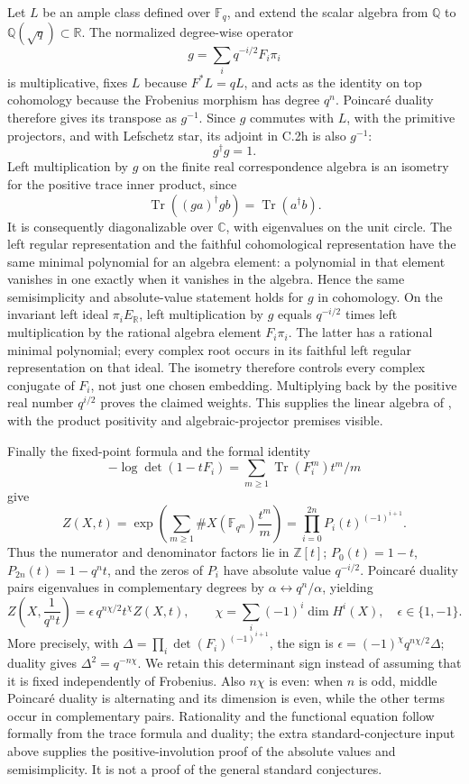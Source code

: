 Let $L$ be an ample class defined over $\mathbb F_q$, and extend the
scalar algebra from $\mathbb Q$ to $\mathbb Q(\sqrt q)\subset\mathbb R$.
The normalized degree-wise operator
\[
                   g=\sum_i q^{-i/2}F_i\pi_i
\]
is multiplicative, fixes $L$ because $F^*L=qL$, and acts as the
identity on top cohomology because the Frobenius morphism has degree
$q^n$. Poincar\'e duality therefore gives its transpose as $g^{-1}$.
Since $g$ commutes with $L$, with the primitive projectors, and with
Lefschetz star, its adjoint in C.2h is also $g^{-1}$:
\[
                             g^\dagger g=1.
\]
Left multiplication by $g$ on the finite real correspondence algebra
is an isometry for the positive trace inner product, since
\[
 \operatorname{Tr}((ga)^\dagger gb)
                   =\operatorname{Tr}(a^\dagger b).
\]
It is consequently diagonalizable over $\mathbb C$, with eigenvalues
on the unit circle. The left regular representation and the faithful
cohomological representation have the same minimal polynomial for an
algebra element: a polynomial in that element vanishes in one exactly
when it vanishes in the algebra. Hence the same semisimplicity and
absolute-value statement holds for $g$ in cohomology. On the invariant
left ideal $\pi_iE_{\mathbb R}$, left multiplication by $g$ equals
$q^{-i/2}$ times left multiplication by the rational algebra element
$F_i\pi_i$. The latter has a rational minimal polynomial; every complex
root occurs in its faithful left regular representation on that ideal.
The isometry therefore controls every complex conjugate of $F_i$, not
just one chosen embedding. Multiplying back by the positive real
number $q^{i/2}$ proves the claimed weights.
This supplies the linear algebra of
\citet[Lemma 4.6 and Theorem 4.7]{cyKleiman1968}, with the product
positivity and algebraic-projector premises visible.

Finally the fixed-point formula and the formal identity
\[
-\log\det(1-tF_i)=\sum_{m\ge1}\operatorname{Tr}(F_i^m)t^m/m
\]
give
\[
 Z(X,t)=\exp\left(\sum_{m\ge1}\#X(\mathbb F_{q^m})\frac{t^m}{m}\right)
       =\prod_{i=0}^{2n}P_i(t)^{(-1)^{i+1}}.
\]
Thus the numerator and denominator factors lie in $\mathbb Z[t]$;
$P_0(t)=1-t$, $P_{2n}(t)=1-q^nt$, and the zeros of $P_i$ have
absolute value $q^{-i/2}$. Poincar\'e duality pairs eigenvalues in
complementary degrees by $\alpha\leftrightarrow q^n/\alpha$, yielding
\[
 Z\left(X,\frac1{q^nt}\right)
        =\epsilon\,q^{n\chi/2}t^\chi Z(X,t),
 \qquad \chi=\sum_i(-1)^i\dim H^i(X),\quad \epsilon\in\{1,-1\}.
\]
More precisely, with
$\Delta=\prod_i\det(F_i)^{(-1)^{i+1}}$, the sign is
$\epsilon=(-1)^\chi q^{n\chi/2}\Delta$;
duality gives $\Delta^2=q^{-n\chi}$.
We retain this determinant sign instead of assuming that it is
fixed independently of Frobenius. Also $n\chi$ is even: when $n$
is odd, middle Poincar\'e duality is alternating and its dimension
is even, while the other terms occur in complementary pairs.
Rationality and the functional equation follow formally from the
trace formula and duality; the extra standard-conjecture input above
supplies the positive-involution proof of the absolute values and
semisimplicity. It is not a proof of the general standard conjectures.
